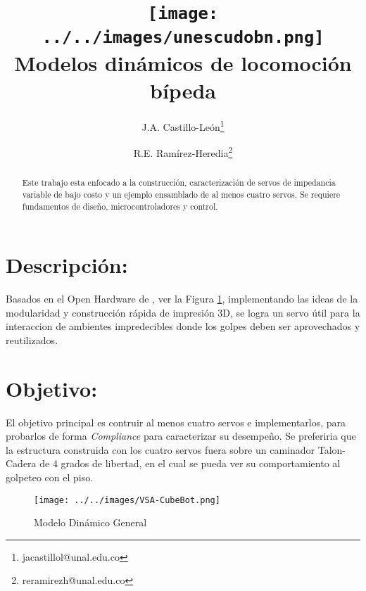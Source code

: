 \documentclass[10pt,onecolumn,twoside,letterpaper]{article}
\title{\vspace{-0.8cm}\texttt{[image: ../../images/unescudobn.png]}\\\vspace{-0.0cm}
  \LARGE \textbf{Modelos din\'amicos de locomoci\'on b\'ipeda}}
\author{J.A. Castillo-Le\'on\thanks{jacastillol@unal.edu.co} \and R.E. Ram\'irez-Heredia\thanks{reramirezh@unal.edu.co}}
\date{}
\begin{document}
\maketitle
\begin{abstract}\small
  Este trabajo esta enfocado a la construcci\'on, caracterizaci\'on de servos de impedancia variable de bajo costo y un ejemplo ensamblado de al menos cuatro servos. Se requiere fundamentos de dise\~no, microcontroladores y control.
\end{abstract}
\section{Descripci\'on:}
Basados en el Open Hardware de \cite{Catalano2011}, ver la Figura \ref{fig:servo}, implementando las ideas de la modularidad y construcci\'on r\'apida de impresi\'on 3D, se logra un servo \'util para la interaccion de ambientes impredecibles donde los golpes deben ser aprovechados y reutilizados.
\section{Objetivo:}
El objetivo principal es contruir al menos cuatro servos e implementarlos, para probarlos de forma \emph{Compliance} para caracterizar su desempe\~no. Se preferiria que la estructura construida con los cuatro servos fuera sobre un caminador Talon-Cadera de 4 grados de libertad, en el cual se pueda ver su comportamiento al golpeteo con el piso.
\begin{figure}[!ht]
  \centering
  \texttt{[image: ../../images/VSA-CubeBot.png]}
  \caption{Modelo Din\'amico General}
  \label{fig:servo}
\end{figure}

\end{document}
